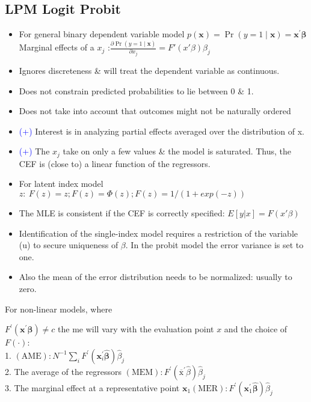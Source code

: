 \documentclass[
]{article}
\begin{document}
\hypertarget{lpm-logit-probit}{%
\subsection{LPM Logit Probit}\label{lpm-logit-probit}}

\begin{itemize}
\item
  For general binary dependent variable model
  \(p(\mathbf{x})=\operatorname{Pr}(y=1 \mid \mathbf{x})=\mathbf{x}^{\prime} \boldsymbol{\beta}\)\\
  Marginal effects of a \(x_{j}\)
  :\(\frac{\partial \operatorname{Pr}(y=1 \mid \mathbf{x})}{\partial x_{j}} = F'(x'\beta)\beta_{j}\)
\item
  Ignores discreteness \& will treat the dependent variable as
  continuous.
\item
  Does not constrain predicted probabilities to lie between 0 \& 1.
\item
  Does not take into account that outcomes might not be naturally
  ordered
\item
  \textcolor{blue}{(+)} Interest is in analyzing partial effects
  averaged over the distribution of x.
\item
  \textcolor{blue}{(+)} The \(x_j\) take on only a few values \& the
  model is saturated. Thus, the CEF is (close to) a linear function of
  the regressors.
\item
  For latent index model
  \(z: \ F(z) = z; F(z) = \Phi (z); F(z) = 1/(1+exp(-z))\)
\item
  The MLE is consistent if the CEF is correctly specified:
  \(E[y|x] = F(x'\beta)\)
\item
  Identification of the single-index model requires a restriction of the
  variable (u) to secure uniqueness of \(\beta\). In the probit model
  the error variance is set to one.
\item
  Also the mean of the error distribution needs to be normalized:
  usually to zero.
\end{itemize}

For non-linear models, where

\(F^{\prime}\left(\mathbf{x}^{\prime} \boldsymbol{\beta}\right) \neq c\)
the me will vary with the evaluation point \(x\) and the choice of
\(F(\cdot)\):\\
1.
\((\mathrm{AME}): N^{-1} \sum_{i} F^{\prime}\left(\mathbf{x}_{i}^{\prime} \widehat{\boldsymbol{\beta}}\right) \widehat{\beta}_{j}\)\\
2. The average of the regressors
\((\mathrm{MEM}): F^{\prime}\left(\overline{\mathrm{x}}^{\prime} \widehat{\beta}\right) \widehat{\beta}_{j}\)\\
3. The marginal effect at a representative point
\(\mathbf{x}_{1}(\mathrm{MER}): F^{\prime}\left(\mathbf{x}_{1}^{\prime} \widehat{\boldsymbol{\beta}}\right) \widehat{\beta}_{j}\)
\end{document}
